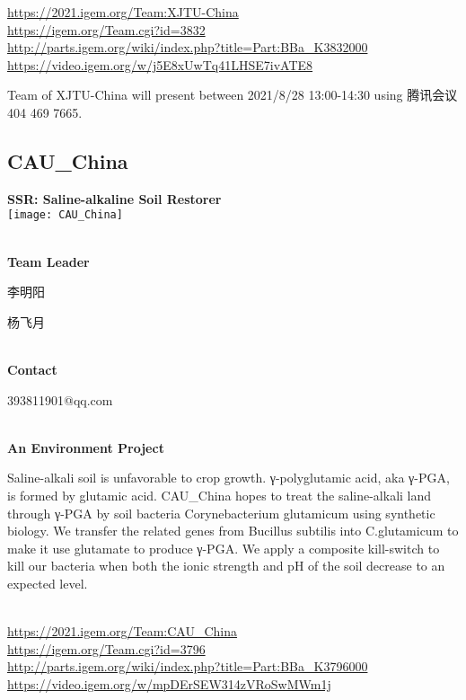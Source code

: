 \url{https://2021.igem.org/Team:XJTU-China }\\
\url{https://igem.org/Team.cgi?id=3832 }\\
\url{http://parts.igem.org/wiki/index.php?title=Part:BBa_K3832000 }\\
\url{https://video.igem.org/w/j5E8xUwTq41LHSE7ivATE8 }\\

\vfill{}









Team of XJTU-China will present between      2021/8/28 13:00-14:30   using 腾讯会议 404 469 7665.
\newpage


\subsection{\textcolor{Blu}{ CAU\_China } }
\vspace{5mm}
\begin{center}
\large{
  \textbf{ SSR: Saline-alkaline Soil Restorer }\\

  \texttt{[image: CAU\_China]}
}
\end{center}
\textbf{\\Team Leader}

  李明阳

  杨飞月


\textbf{\\Contact}

  393811901@qq.com


\textbf{\\An Environment Project\\}\begin{spacing}{1.5}

Saline-alkali soil is unfavorable to crop growth. γ-polyglutamic acid, aka γ-PGA, is formed by glutamic acid. CAU\_China hopes to treat the saline-alkali land through γ-PGA by soil bacteria Corynebacterium glutamicum using synthetic biology. We transfer the related genes from Bucillus subtilis into C.glutamicum to make it use glutamate to produce γ-PGA. We apply a composite kill-switch to kill our bacteria when both the ionic strength and pH of the soil decrease to an expected level.\end{spacing}
\\

\url{https://2021.igem.org/Team:CAU\_China }\\
\url{https://igem.org/Team.cgi?id=3796 }\\
\url{http://parts.igem.org/wiki/index.php?title=Part:BBa_K3796000 }\\
\url{https://video.igem.org/w/mpDErSEW314zVRoSwMWm1j }\\

